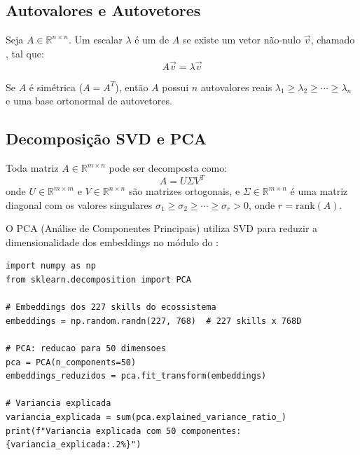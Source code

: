 \subsection{Autovalores e Autovetores}

\begin{definicao}
    Seja $A \in \mathbb{R}^{n \times n}$. Um escalar $\lambda$ é um
     de $A$ se existe um vetor não-nulo $\vec{v}$,
    chamado , tal que:
    \[
    A\vec{v} = \lambda \vec{v}
    \]
\end{definicao}

\begin{teorema}
    Se $A$ é simétrica ($A = A^T$), então $A$ possui $n$ autovalores reais
    $\lambda_1 \geq \lambda_2 \geq \cdots \geq \lambda_n$ e uma base
    ortonormal de autovetores.
\end{teorema}

\subsection{Decomposição SVD e PCA}

\begin{definicao}
    Toda matriz $A \in \mathbb{R}^{m \times n}$ pode ser decomposta como:
    \[
    A = U \Sigma V^T
    \]
    onde $U \in \mathbb{R}^{m \times m}$ e $V \in \mathbb{R}^{n \times n}$
    são matrizes ortogonais, e $\Sigma \in \mathbb{R}^{m \times n}$ é uma
    matriz diagonal com os valores singulares $\sigma_1 \geq \sigma_2 \geq
    \cdots \geq \sigma_r > 0$, onde $r = \text{rank}(A)$.
\end{definicao}

\begin{exemplo}
    O PCA (Análise de Componentes Principais) utiliza SVD para reduzir a
    dimensionalidade dos embeddings no módulo  do
    \opencodeeco{}:
    \begin{lstlisting}[style=pythonstyle]
import numpy as np
from sklearn.decomposition import PCA

# Embeddings dos 227 skills do ecossistema
embeddings = np.random.randn(227, 768)  # 227 skills x 768D

# PCA: reducao para 50 dimensoes
pca = PCA(n_components=50)
embeddings_reduzidos = pca.fit_transform(embeddings)

# Variancia explicada
variancia_explicada = sum(pca.explained_variance_ratio_)
print(f"Variancia explicada com 50 componentes: {variancia_explicada:.2%}")
    \end{lstlisting}
\end{exemplo}

